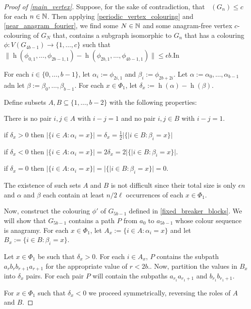 \documentclass{patmorin}
\DeclareMathOperator{\afcn}{\dot{\chi}_\pi}
\DeclareMathOperator{\hist}{h}
\begin{document}
\begin{proof}[Proof of \cref{main_vertex}]
    Suppose, for the sake of contradiction, that $\afcn(G_n)\le c$ for each $n\in\mathbb{N}$.  Then applying \cref{periodic_vertex_colouring} and \cref{near_anagram_fourier}, we find some $N\in\mathbb{N}$ and some anagram-free vertex $c$-colouring of $G_N$ that, contains a subgraph isomorphic to $G_n$ that has a colouring $\phi:V(G_{4b-1})\to\{1,\ldots,c\}$ such that $\|\hist(\phi_{0,1},\ldots,\phi_{2b-1,1})-\hist(\phi_{2b,1},\ldots,\phi_{4b-1,1})\|\le\epsilon b$.In

    For each $i\in\{0,\ldots,b-1\}$, let $\alpha_i:=\phi_{2i,1}$ and $\beta_i:=\phi_{2b+2i}$. Let $\alpha:=\alpha_0,\ldots,\alpha_{b-1}$ adn let $\beta:=\beta_0,\ldots,\beta_{b-1}$.  For each $x\in\Phi_1$, let $\delta_x:=\hist(\alpha)-\hist(\beta)$.

    Define subsets $A,B\subseteq \{1,\ldots,b-2\}$ with the following properties:
    \begin{compactenum}[(a)]
        \item There is no pair $i,j\in A$ with $i-j=1$ and no pair $i,j\in B$ with $i-j=1$.
        \item if $\delta_x>0$ then $|\{i\in A:\alpha_i=x\}|=\delta_x=\tfrac{1}{2}|\{|i\in B:\beta_i=x\}|$
        \item if $\delta_x<0$ then $|\{i\in A:\alpha_i=x\}|=2\delta_x=2|\{|i\in B:\beta_i=x\}|$.
        \item if $\delta_x=0$ then $|\{i\in A:\alpha_i=x\}|=|\{|i\in B:\beta_i=x\}|=0$.
    \end{compactenum}
    The existence of such sets $A$ and $B$ is not difficult since their total size is only $\epsilon n$ and $\alpha$ and $\beta$ each contain at least $n/2\ell$ occurrences of each $x\in\Phi_1$.

    Now, construct the colouring $\phi'$ of $G_{5b-1}$ defined in \cref{fixed_breaker_blocks}.  We will show that $G_{5b-1}$ contains a path $P$ from $a_0$ to $a_{5b-1}$ whose colour sequence is anagramy.  For each $x\in\Phi_1$, let $A_x:=\{i\in A:\alpha_i=x\}$ and let $B_x:=\{i\in B:\beta_i=x\}$.

    Let $x\in\Phi_1$ be such that $\delta_x>0$.
    For each $i\in A_x$, $P$ contains the subpath $a_rb_rb_{r+1}a_{r+1}$ for the appropriate value of $r<2b$..  Now, partition the values in $B_x$ into $\delta_x$ pairs. For each pair $P$ will contain the subpaths $a_{r_1}a_{r_1+1}$ and $b_{r_1}b_{r_1+1}$.

    For $x\in\Phi_1$ such that $\delta_x < 0$ we proceed symmetrically, reversing the roles of $A$ and $B$.
\end{proof}
\end{document}
